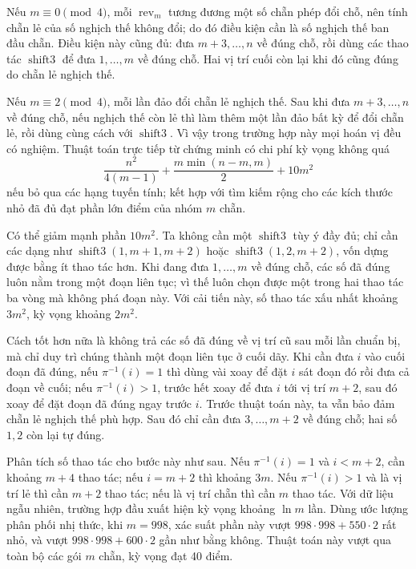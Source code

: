 \documentclass[11pt]{article}
\begin{document}
Nếu $m\equiv 0\pmod 4$, mỗi $\operatorname{rev}_m$ tương đương một số chẵn phép
đổi chỗ, nên tính chẵn lẻ của số nghịch thế không đổi; do đó điều kiện cần là
số nghịch thế ban đầu chẵn. Điều kiện này cũng đủ: đưa $m+3,\ldots,n$ về đúng
chỗ, rồi dùng các thao tác $\operatorname{shift3}$ để đưa $1,\ldots,m$ về đúng
chỗ. Hai vị trí cuối còn lại khi đó cũng đúng do chẵn lẻ nghịch thế.

Nếu $m\equiv 2\pmod 4$, mỗi lần đảo đổi chẵn lẻ nghịch thế. Sau khi đưa
$m+3,\ldots,n$ về đúng chỗ, nếu nghịch thế còn lẻ thì làm thêm một lần đảo bất
kỳ để đổi chẵn lẻ, rồi dùng cùng cách với $\operatorname{shift3}$. Vì vậy trong
trường hợp này mọi hoán vị đều có nghiệm. Thuật toán trực tiếp từ chứng minh có
chi phí kỳ vọng không quá
\[
  \frac{n^2}{4(m-1)}+\frac{m\min(n-m,m)}2+10m^2
\]
nếu bỏ qua các hạng tuyến tính; kết hợp với tìm kiếm rộng cho các kích thước
nhỏ đã đủ đạt phần lớn điểm của nhóm $m$ chẵn.

Có thể giảm mạnh phần $10m^2$. Ta không cần một
$\operatorname{shift3}$ tùy ý đầy đủ; chỉ cần các dạng như
$\operatorname{shift3}(1,m+1,m+2)$ hoặc
$\operatorname{shift3}(1,2,m+2)$, vốn dựng được bằng ít thao tác hơn. Khi đang
đưa $1,\ldots,m$ về đúng chỗ, các số đã đúng luôn nằm trong một đoạn liên tục;
vì thế luôn chọn được một trong hai thao tác ba vòng mà không phá đoạn này. Với
cải tiến này, số thao tác xấu nhất khoảng $3m^2$, kỳ vọng khoảng $2m^2$.

Cách tốt hơn nữa là không trả các số đã đúng về vị trí cũ sau mỗi lần chuẩn bị,
mà chỉ duy trì chúng thành một đoạn liên tục ở cuối dãy. Khi cần đưa $i$ vào
cuối đoạn đã đúng, nếu $\pi^{-1}(i)=1$ thì dùng vài xoay để đặt $i$ sát đoạn đó
rồi đưa cả đoạn về cuối; nếu $\pi^{-1}(i)>1$, trước hết xoay để đưa $i$ tới vị
trí $m+2$, sau đó xoay để đặt đoạn đã đúng ngay trước $i$. Trước thuật toán này,
ta vẫn bảo đảm chẵn lẻ nghịch thế phù hợp. Sau đó chỉ cần đưa $3,\ldots,m+2$ về
đúng chỗ; hai số $1,2$ còn lại tự đúng.

Phân tích số thao tác cho bước này như sau. Nếu $\pi^{-1}(i)=1$ và $i<m+2$, cần
khoảng $m+4$ thao tác; nếu $i=m+2$ thì khoảng $3m$. Nếu $\pi^{-1}(i)>1$ và là
vị trí lẻ thì cần $m+2$ thao tác; nếu là vị trí chẵn thì cần $m$ thao tác. Với
dữ liệu ngẫu nhiên, trường hợp đầu xuất hiện kỳ vọng khoảng $\ln m$ lần. Dùng
ước lượng phân phối nhị thức, khi $m=998$, xác suất phần này vượt
$998\cdot998+550\cdot2$ rất nhỏ, và vượt $998\cdot998+600\cdot2$ gần như bằng
không. Thuật toán này vượt qua toàn bộ các gói $m$ chẵn, kỳ vọng đạt 40 điểm.
\end{document}
